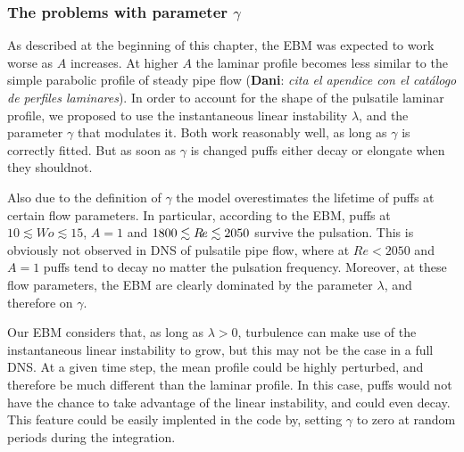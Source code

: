\documentclass{article}
\DeclareRobustCommand{\dm}[1]{{\color{blue}(\textbf{Dani}: \textit{#1}\xspace)}}
\DeclareRobustCommand{\Reynolds}{\ensuremath{R\hspace{-0.1em}e}\xspace}     %
\DeclareRobustCommand{\Amplitude}{\ensuremath{A}\xspace}    %
\begin{document}
\subsubsection{The problems with parameter $\gamma$}
As described at the beginning of this chapter, the EBM was expected to work worse as $\Amplitude$ increases. At higher $\Amplitude$ the laminar profile becomes less similar to the simple parabolic profile of steady pipe flow \dm{cita el apendice con el catálogo de perfiles laminares}. In order to account for the shape of the pulsatile laminar profile, we proposed to use the instantaneous linear instability $\lambda$, and the parameter $\gamma$ that modulates it. Both work reasonably well, as long as $\gamma$ is correctly fitted. But as soon as $\gamma$ is changed puffs either decay or elongate when they shouldnot.

Also due to the definition of $\gamma$ the model overestimates the lifetime of puffs at certain flow parameters. In particular, according to the EBM, puffs at $10 \lesssim Wo \lesssim 15$, $A= 1$ and $1800 \lesssim \Reynolds \lesssim 2050$ survive the pulsation. This is obviously not observed in DNS of pulsatile pipe flow, where at $Re <2050$ and $A=1$ puffs tend to decay no matter the pulsation frequency. Moreover, at these flow parameters, the EBM are clearly dominated by the parameter $\lambda$, and therefore on $\gamma$. 

Our EBM considers that, as long as $\lambda>0$, turbulence can make use of the instantaneous linear instability to grow, but this may not be the case in a full DNS. At a given time step, the mean profile could be highly perturbed, and therefore be much different than the laminar profile. In this case, puffs would not have the chance to take advantage of the linear instability, and could even decay. This feature could be easily implented in the code by, setting $\gamma$ to zero at random periods during the integration.













\end{document}
